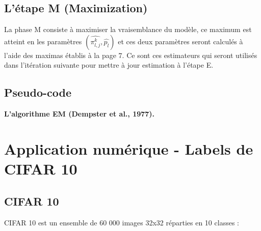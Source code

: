 \documentclass[frenchb]{report}
\newcommand{\1}{\mathbbm{1}}
\theoremstyle{definition}\newtheorem{defn}{Définition}
\theoremstyle{definition}\newtheorem{exm}{Exemple}
\theoremstyle{definition}\newtheorem{nota}{Notation}
\theoremstyle{definition}\newtheorem{rem}{Remarque}
\begin{document}
\section{L'étape M (Maximization)}

La phase M consiste à maximiser la vraisemblance du modèle, ce maximum est atteint en les paramètres $\left(\widehat{\pi^k_{l,j}}, \widehat{p_l} \right)$ et ces deux paramètres seront calculés à l'aide des maximas établis à la page $7$. Ce sont ces estimateurs qui seront utilisés dans l'itération suivante pour mettre à jour estimation à l'étape E.

\section{Pseudo-code}

\begin{algorithm}
	\caption{\textbf{L’algorithme EM (Dempster et al., 1977).}}
	\begin{algorithmic}[1]
		\ENDFOR
	\end{algorithmic}
\end{algorithm}

\chapter{Application numérique - Labels de CIFAR 10}

\section{CIFAR 10}
CIFAR 10 est un ensemble de 60 000 images 32x32 réparties en 10 classes :
\end{document}
